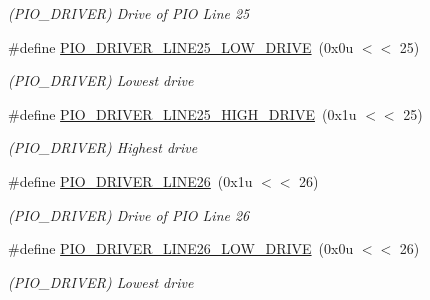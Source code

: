 \begin{DoxyCompactItemize}
\begin{DoxyCompactList}\small\item\em (P\+I\+O\+\_\+\+D\+R\+I\+V\+ER) Drive of P\+IO Line 25 \end{DoxyCompactList}\item 
\mbox{\label{group__SAMV71__PIO_ga96a9aaf154c0cc69aeaa3984fa003905}} 
\#define \mbox{\hyperlink{group__SAMV71__PIO_ga96a9aaf154c0cc69aeaa3984fa003905}{P\+I\+O\+\_\+\+D\+R\+I\+V\+E\+R\+\_\+\+L\+I\+N\+E25\+\_\+\+L\+O\+W\+\_\+\+D\+R\+I\+VE}}~(0x0u $<$$<$ 25)
\begin{DoxyCompactList}\small\item\em (P\+I\+O\+\_\+\+D\+R\+I\+V\+ER) Lowest drive \end{DoxyCompactList}\item 
\mbox{\label{group__SAMV71__PIO_ga739e54f9d4c19e6e722202b6828a787f}} 
\#define \mbox{\hyperlink{group__SAMV71__PIO_ga739e54f9d4c19e6e722202b6828a787f}{P\+I\+O\+\_\+\+D\+R\+I\+V\+E\+R\+\_\+\+L\+I\+N\+E25\+\_\+\+H\+I\+G\+H\+\_\+\+D\+R\+I\+VE}}~(0x1u $<$$<$ 25)
\begin{DoxyCompactList}\small\item\em (P\+I\+O\+\_\+\+D\+R\+I\+V\+ER) Highest drive \end{DoxyCompactList}\item 
\mbox{\label{group__SAMV71__PIO_ga01ca9f2e050c3c12260122e506e02a9a}} 
\#define \mbox{\hyperlink{group__SAMV71__PIO_ga01ca9f2e050c3c12260122e506e02a9a}{P\+I\+O\+\_\+\+D\+R\+I\+V\+E\+R\+\_\+\+L\+I\+N\+E26}}~(0x1u $<$$<$ 26)
\begin{DoxyCompactList}\small\item\em (P\+I\+O\+\_\+\+D\+R\+I\+V\+ER) Drive of P\+IO Line 26 \end{DoxyCompactList}\item 
\mbox{\label{group__SAMV71__PIO_gaf7baf4dab9cde8346cfc635970b83623}} 
\#define \mbox{\hyperlink{group__SAMV71__PIO_gaf7baf4dab9cde8346cfc635970b83623}{P\+I\+O\+\_\+\+D\+R\+I\+V\+E\+R\+\_\+\+L\+I\+N\+E26\+\_\+\+L\+O\+W\+\_\+\+D\+R\+I\+VE}}~(0x0u $<$$<$ 26)
\begin{DoxyCompactList}\small\item\em (P\+I\+O\+\_\+\+D\+R\+I\+V\+ER) Lowest drive \end{DoxyCompactList}\item 

\end{DoxyCompactItemize}
